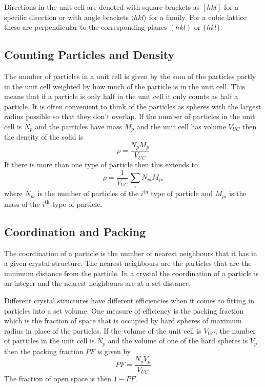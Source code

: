     Directions in the unit cell are denoted with square brackets as \([hkl]\) for a specific direction or with angle brackets \(\langle hkl\rangle\) for a family.
    For a cubic lattice these are perpendicular to the corresponding planes \((hkl)\) or \(\{hkl\}\).
    
    \subsection{Counting Particles and Density}
    The number of particles in a unit cell is given by the sum of the particles partly in the unit cell weighted by how much of the particle is in the unit cell.
    This means that if a particle is only half in the unit cell it only counts as half a particle.
    It is often convenient to think of the particles as spheres with the largest radius possible so that they don't overlap.
    If the number of particles in the unit cell is \(N_p\) and the particles have mass \(M_p\) and the unit cell has volume \(V_{UC}\) then the density of the solid is
    \[\rho = \frac{N_pM_p}{V_{UC}}\]
    If there is more than one type of particle then this extends to
    \[\rho = \frac{1}{V_{UC}}\sum_i N_{pi}M_{pi}\]
    where \(N_{pi}\) is the number of particles of the \(i^\text{th}\) type of particle and \(M_{pi}\) is the mass of the \(i^\text{th}\) type of particle.
    
    \subsection{Coordination and Packing}
    The coordination of a particle is the number of nearest neighbours that it has in a given crystal structure.
    The nearest neighbours are the particles that are the minimum distance from the particle.
    In a crystal the coordination of a particle is an integer and the nearest neighbours are at a set distance.
    
    Different crystal structures have different efficiencies when it comes to fitting in particles into a set volume.
    One measure of efficiency is the packing fraction which is the fraction of space that is occupied by hard spheres of maximum radius in place of the particles.
    If the volume of the unit cell is \(V_{UC}\), the number of particles in the unit cell is \(N_p\) and the volume of one of the hard spheres is \(V_p\) then the packing fraction \(PF\) is given by
    \[PF = \frac{N_pV_p}{V_{UC}}\]
    The fraction of open space is then \(1 - PF\).
    
